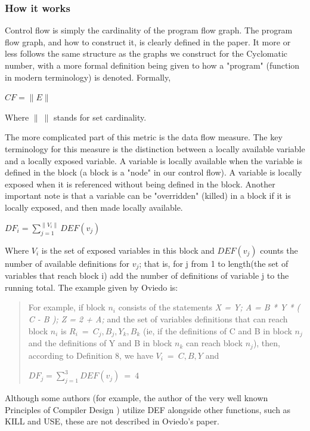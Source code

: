 \documentclass[]{article}
\begin{document}

\subsubsection{How it works}

Control flow is simply the cardinality of the program flow graph.
The program flow graph, and how to construct it, is clearly defined in the paper.
It more or less follows the same structure as the graphs we construct for the Cyclomatic number, with a more formal definition being given to how a "program" (function in modern terminology) is denoted.
Formally,

$CF=\parallel E\parallel$

Where $\parallel ~\parallel$ stands for set cardinality.

The more complicated part of this metric is the data flow measure.
The key terminology for this measure is the distinction between a locally available variable and a locally exposed variable.
A variable is locally available when the variable is defined in the block (a block is a "node" in our control flow).
A variable is locally exposed when it is referenced without being defined in the block.
Another important note is that a variable can be "overridden" (killed) in a block if it is locally exposed, and then made locally available.

$DF_i = \sum\limits_{j=1}^{\parallel V_i \parallel} DEF(v_j)$

Where $V_i$ is the set of exposed variables in this block and $DEF(v_j)$ counts the number of available definitions for $v_j$; that is, for j from 1 to length(the set of variables that reach block i) add the number of definitions of variable j to the running total.
The example given by Oviedo is:
\begin{quotation}
	For example, if block $n_i$ consists of the statements \textit{X = Y; A = B * Y * ( C - B ); Z = 2 + A;} and the set of variables definitions that can reach block $n_i$ is $R_i ~= ~{C_j, B_j, Y_k, B_k}$ (ie, if the definitions of C and B in block $n_j$ and the definitions of Y and B in block $n_k$ can reach block $n_j$), then, according to Definition 8, we have $V_i ~= ~{C,B,Y}$ and
	
	$DF_j = \sum\limits_{j=1}^{3} DEF(v_j)~=~4$ \cite{ref:oviedo1993control}
\end{quotation}

Although some authors (for example, the author of the very well known Principles of Compiler Design \cite{aho1977principles}) utilize DEF alongside other functions, such as KILL and USE, these are not described in Oviedo's paper.
\end{document}
